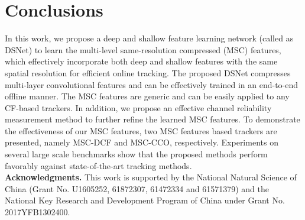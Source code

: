 \documentclass[runningheads]{llncs}
\begin{document}



\section{Conclusions}
In this work, we propose a deep and shallow feature learning network (called as DSNet) to learn the multi-level same-resolution compressed (MSC) features, which effectively incorporate both deep and shallow features with the same spatial resolution for efficient online tracking. The proposed DSNet compresses multi-layer convolutional features and can be effectively trained in an end-to-end offline manner. The MSC features are generic and can be easily applied to any CF-based trackers. In addition, we propose an effective channel reliability measurement method to further refine the learned MSC features. To demonstrate the effectiveness of our MSC features, two MSC features based trackers are presented, namely MSC-DCF and MSC-CCO, respectively. Experiments on several large scale benchmarks show that the proposed methods perform favorably against state-of-the-art tracking methods.
\\

\noindent \textbf{Acknowledgments.} This work is supported by the National Natural Science of China (Grant No. U1605252, 61872307, 61472334 and 61571379) and the National Key Research and Development Program of China under Grant No. 2017YFB1302400.




\end{document}
